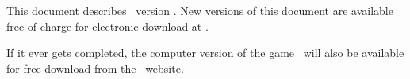 %

This document describes \know\ version \kversion.  New versions
of this document are available free of charge for electronic
download at
.

If it ever gets completed, the computer version of the game \know\ 
will also be available for free download from the \know\ website.

%

